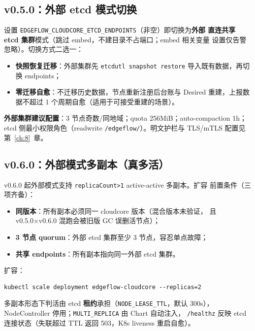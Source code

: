 \subsection{v0.5.0：外部 etcd 模式切换}

设置 \texttt{EDGEFLOW\_CLOUDCORE\_ETCD\_ENDPOINTS}（非空）即切换为\textbf{外部
直连共享 etcd 集群}模式（跳过 embed，不建目录不占端口；embed 相关变量
设置仅告警忽略）。切换方式二选一：

\begin{itemize}
  \item \textbf{快照恢复迁移}：外部集群先 \texttt{etcdutl snapshot restore}
        导入既有数据，再切换 endpoints；
  \item \textbf{零迁移自愈}：不迁移历史数据，节点重新注册后台账与 Desired
        重建，上报数据不超过 1 个周期自愈（适用于可接受重建的场景）。
\end{itemize}

\textbf{外部集群建议配置}：3 节点奇数/同地域；quota 256MiB；auto-compaction
1h；etcd 侧最小权限角色（readwrite \texttt{/edgeflow/}）。明文护栏与
TLS/mTLS 配置见第~\ref{ch:8}~章。

\subsection{v0.6.0：外部模式多副本（真多活）}

v0.6.0 起外部模式支持 \texttt{replicaCount>1} active-active 多副本。扩容
前置条件（三项齐备）：

\begin{itemize}
  \item \textbf{同版本}：所有副本必须同一 cloudcore 版本（混合版本未验证，
        且 v0.5.0×v0.6.0 混跑会被旧版 GC 误删活节点）；
  \item \textbf{3 节点 quorum}：外部 etcd 集群至少 3 节点，容忍单点故障；
  \item \textbf{共享 endpoints}：所有副本指向同一外部 etcd 集群。
\end{itemize}

扩容：

\begin{lstlisting}
kubectl scale deployment edgeflow-cloudcore --replicas=2
\end{lstlisting}

多副本形态下判活由 etcd \textbf{租约}承担（\texttt{NODE\_LEASE\_TTL}，默认
300s），NodeController 停用；\texttt{MULTI\_REPLICA} 由 Chart 自动注入，
\texttt{/healthz} 反映 etcd 连接状态（失联超过 TTL 返回 503，K8s liveness
重启自愈）。

